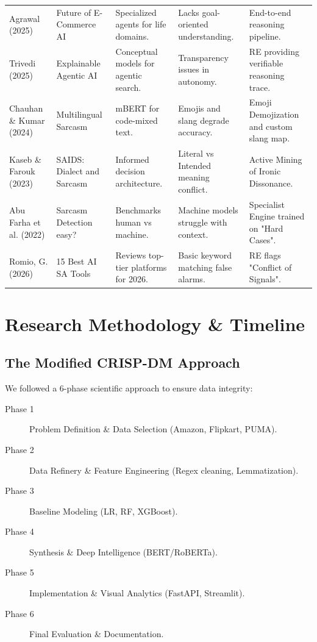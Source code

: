 \documentclass[11pt,oneside]{scrbook}
\begin{document}
\begin{longtable}{p{2.2cm}p{2.5cm}p{2.5cm}p{3.2cm}p{3.2cm}}
\addlinespace
Agrawal (2025) & Future of E-Commerce AI & Specialized agents for life domains. & Lacks goal-oriented understanding. & End-to-end reasoning pipeline. \\
\addlinespace
Trivedi (2025) & Explainable Agentic AI & Conceptual models for agentic search. & Transparency issues in autonomy. & RE providing verifiable reasoning trace. \\
\addlinespace
Chauhan \& Kumar (2024) & Multilingual Sarcasm & mBERT for code-mixed text. & Emojis and slang degrade accuracy. & Emoji Demojization and custom slang map. \\
\addlinespace
Kaseb \& Farouk (2023) & SAIDS: Dialect and Sarcasm & Informed decision architecture. & Literal vs Intended meaning conflict. & Active Mining of Ironic Dissonance. \\
\addlinespace
Abu Farha et al. (2022) & Sarcasm Detection easy? & Benchmarks human vs machine. & Machine models struggle with context. & Specialist Engine trained on "Hard Cases". \\
\addlinespace
Romio, G. (2026) & 15 Best AI SA Tools & Reviews top-tier platforms for 2026. & Basic keyword matching false alarms. & RE flags "Conflict of Signals". \\
\end{longtable}

\cleardoublepage
\chapter{Research Methodology \& Timeline}

\section{The Modified CRISP-DM Approach}
We followed a 6-phase scientific approach to ensure data integrity:
\begin{description}
    \item[Phase 1] Problem Definition \& Data Selection (Amazon, Flipkart, PUMA).
    \item[Phase 2] Data Refinery \& Feature Engineering (Regex cleaning, Lemmatization).
    \item[Phase 3] Baseline Modeling (LR, RF, XGBoost).
    \item[Phase 4] Synthesis \& Deep Intelligence (BERT/RoBERTa).
    \item[Phase 5] Implementation \& Visual Analytics (FastAPI, Streamlit).
    \item[Phase 6] Final Evaluation \& Documentation.
\end{description}
\end{document}
